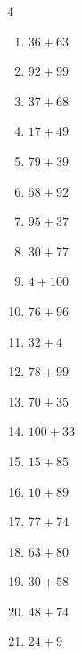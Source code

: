 \begin{multicols}{4}
\begin{enumerate}
  \item $36+63$
        \phantom{$=99$}

  \item $92+99$
        \phantom{$=191$}

  \item $37+68$
        \phantom{$=105$}

  \item $17+49$
        \phantom{$=66$}

  \item $79+39$
        \phantom{$=118$}

  \item $58+92$
        \phantom{$=150$}

  \item $95+37$
        \phantom{$=132$}

  \item $30+77$
        \phantom{$=107$}

  \item $4+100$
        \phantom{$=104$}

  \item $76+96$
        \phantom{$=172$}

  \item $32+4$
        \phantom{$=36$}

  \item $78+99$
        \phantom{$=177$}

  \item $70+35$
        \phantom{$=105$}

  \item $100+33$
        \phantom{$=133$}

  \item $15+85$
        \phantom{$=100$}

  \item $10+89$
        \phantom{$=99$}

  \item $77+74$
        \phantom{$=151$}

  \item $63+80$
        \phantom{$=143$}

  \item $30+58$
        \phantom{$=88$}

  \item $48+74$
        \phantom{$=122$}

\columnbreak %

  \item $24+9$
        \phantom{$=33$}


\end{enumerate}
\end{multicols}
